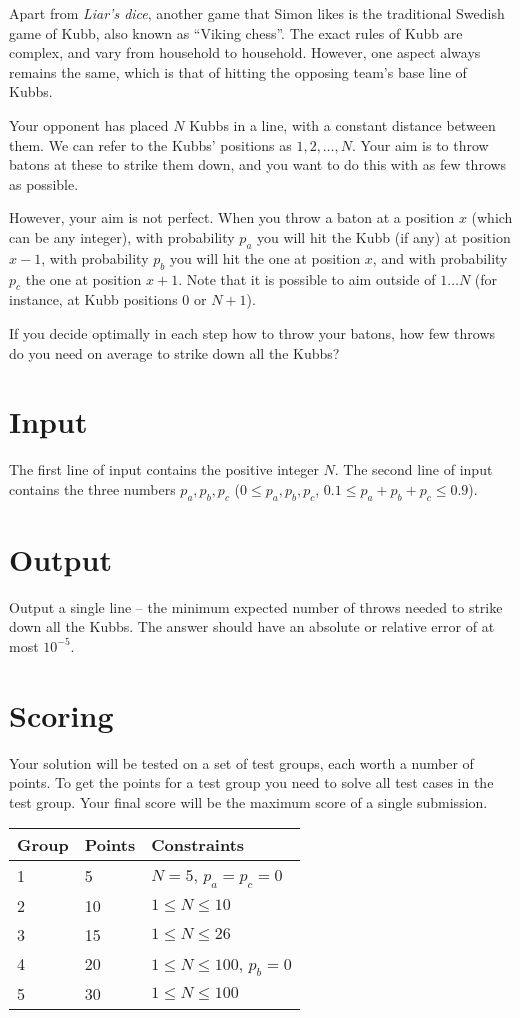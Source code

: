 Apart from \emph{Liar's dice}, another game that Simon likes is the traditional Swedish game of Kubb,
also known as ``Viking chess''.
The exact rules of Kubb are complex, and vary from household to household.
However, one aspect always remains the same, which is that of hitting the opposing team's base line of Kubbs.

Your opponent has placed $N$ Kubbs in a line, with a constant distance between them.
We can refer to the Kubbs' positions as $1, 2, \dots, N$.
Your aim is to throw batons at these to strike them down, and
you want to do this with as few throws as possible.

However, your aim is not perfect. When you throw a baton at a position $x$ (which can be any integer),
with probability $p_a$ you will hit the Kubb (if any) at position $x-1$,
with probability $p_b$ you will hit the one at position $x$, and
with probability $p_c$ the one at position $x+1$.
Note that it is possible to aim outside of $1 \dots N$ (for instance, at Kubb positions $0$ or $N+1$).

If you decide optimally in each step how to throw your batons,
how few throws do you need on average to strike down all the Kubbs?

\section*{Input}
The first line of input contains the positive integer $N$.
The second line of input contains the three numbers $p_a, p_b, p_c$ ($0 \le p_a, p_b, p_c$, $0.1 \le p_a + p_b + p_c \le 0.9$).

\section*{Output}
Output a single line -- the minimum expected number of throws needed to strike down all the Kubbs.
The answer should have an absolute or relative error of at most $10^{-5}$.

\section*{Scoring}
Your solution will be tested on a set of test groups, each worth a number of points.
To get the points for a test group you need to solve all test cases in the test group.
Your final score will be the maximum score of a single submission.

\noindent
\begin{tabular}{| l | l | l |}
\hline
Group & Points & Constraints \\ \hline
1     & 5      & $N = 5$, $p_a = p_c = 0$ \\ \hline
2     & 10     & $1 \le N \le 10$ \\ \hline
3     & 15     & $1 \le N \le 26$ \\ \hline
4     & 20     & $1 \le N \le 100$, $p_b = 0$ \\ \hline
5     & 30     & $1 \le N \le 100$ \\ \hline
\end{tabular}
